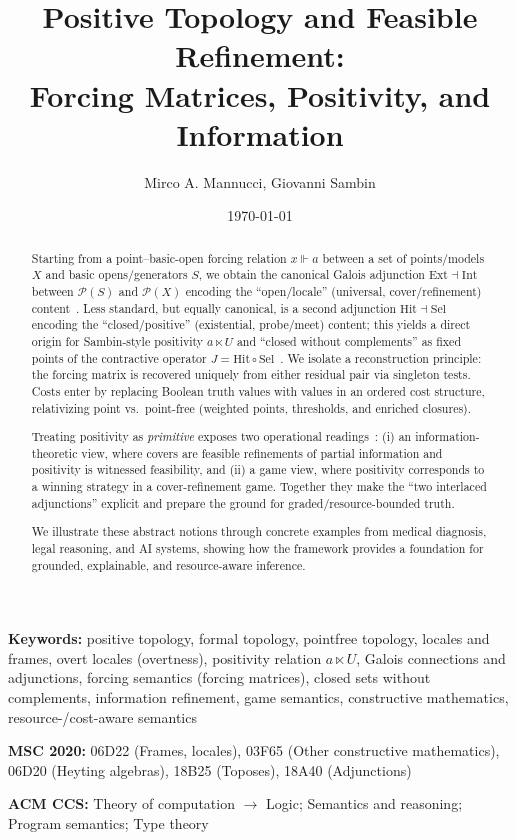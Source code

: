 \documentclass[11pt]{article}
\title{Positive Topology and Feasible Refinement: \\ Forcing Matrices, Positivity, and Information}
\author{Mirco A. Mannucci, Giovanni Sambin}
\date{\today}
\theoremstyle{definition}
\theoremstyle{plain}
\newcommand{\Pow}{\mathcal P}
\newcommand{\Ext}{\mathrm{Ext}}
\newcommand{\Intt}{\mathrm{Int}}
\newcommand{\Hit}{\mathrm{Hit}}
\newcommand{\Sel}{\mathrm{Sel}}
\newcommand{\forces}{\Vdash}
\newcommand{\ltimesrel}{\ltimes}
\begin{document}
\maketitle

\begin{center}
\textbf{Keywords:} positive topology, formal topology, pointfree topology, locales and frames, overt locales (overtness), positivity relation $a\ltimes U$, Galois connections and adjunctions, forcing semantics (forcing matrices), closed sets without complements, information refinement, game semantics, constructive mathematics, resource-/cost-aware semantics

\medskip
\textbf{MSC 2020:} 06D22 (Frames, locales), 03F65 (Other constructive mathematics), 06D20 (Heyting algebras), 18B25 (Toposes), 18A40 (Adjunctions)

\medskip
\textbf{ACM CCS:} Theory of computation $\to$ Logic; Semantics and reasoning; Program semantics; Type theory
\end{center}


\begin{abstract}
Starting from a point--basic-open forcing relation $x\forces a$ between a set of points/models $X$
and basic opens/generators $S$, we obtain the canonical Galois adjunction
$\Ext \dashv \Intt$ between $\Pow(S)$ and $\Pow(X)$ encoding the ``open/locale'' (universal, cover/refinement) content~\cite{MacLaneMoerdijk1992}.
Less standard, but equally canonical, is a second adjunction $\Hit \dashv \Sel$ encoding the ``closed/positive''
(existential, probe/meet) content; this yields a direct origin for Sambin-style positivity $a\ltimesrel U$
and ``closed without complements'' as fixed points of the contractive operator $J=\Hit\circ\Sel$~\cite{Sambin-OUP-PositiveTopology,CoquandSambinSmithValentini2003}.
We isolate a reconstruction principle: the forcing matrix is recovered uniquely from either residual pair via singleton tests.
Costs enter by replacing Boolean truth values with values in an ordered cost structure, relativizing point vs.\ point-free
(weighted points, thresholds, and enriched closures).

Treating positivity as \emph{primitive} exposes two operational readings~\cite{Valentini2012,CirauloVickers2016}:
(i) an information-theoretic view, where covers are feasible refinements of partial information and positivity is witnessed feasibility, and
(ii) a game view, where positivity corresponds to a winning strategy in a cover-refinement game.
Together they make the ``two interlaced adjunctions'' explicit and prepare the ground for graded/resource-bounded truth.

We illustrate these abstract notions through concrete examples from medical diagnosis, legal reasoning, and AI systems,
showing how the framework provides a foundation for grounded, explainable, and resource-aware inference.
\end{abstract}
\end{document}
